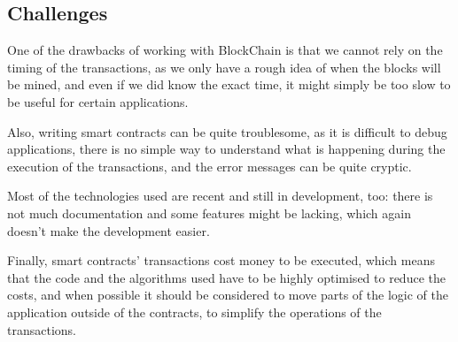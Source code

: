 \documentclass[10pt]{article}
\begin{document}
\subsection{Challenges}
One of the drawbacks of working with BlockChain is that we cannot rely on the
timing of the transactions, as we only have a rough idea of when the blocks
will be mined, and even if we did know the exact time, it might simply be too slow
 to be useful for certain applications.

Also, writing smart contracts can be quite troublesome, as it is difficult to
debug applications, there is no simple way to understand what is happening
during the execution of the transactions, and the error messages can be quite
cryptic.

Most of the technologies used are recent and still in development, too: there is
not much documentation and some features might be lacking, which again doesn't
make the development easier.

Finally, smart contracts' transactions cost money to be executed, which means
that the code and the algorithms used have to be highly optimised to reduce the
costs, and when possible it should be considered to move parts of the logic of
the application outside of the contracts, to simplify the operations of the
transactions.
\end{document}
